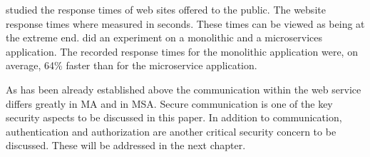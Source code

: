 \begin{sloppypar}
    \citet{webdelays} studied the response times of web sites offered to the
    public. The website response times where measured in seconds. These times
    can be viewed as being at the extreme end. \citet{Johansson_2019} did an
    experiment on a monolithic and a microservices application. The recorded
    response times for the monolithic application were, on average, 64\% faster
    than for the microservice application.
\end{sloppypar}
\begin{sloppypar}
    As has been already established above the communication within the web
    service differs greatly in MA and in MSA. Secure communication is one of the
    key security aspects to be discussed in this paper. In addition to
    communication, authentication and authorization are another critical
    security concern to be discussed. These will be addressed in the next
    chapter.
\end{sloppypar}



